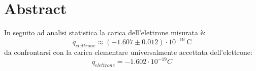 \section{Abstract}    
\normalsize
    In seguito ad analisi statistica la carica dell'elettrone misurata è:
        $$q_{elettrone}\approx \left(-1.607\pm0.012\right)\cdot10^{-19}~\mathrm{C}$$
    da confrontarsi con la carica elementare universalmente accettata dell'elettrone: 
        $$q_{elettrone}=-1.602\cdot10^{-19} C$$